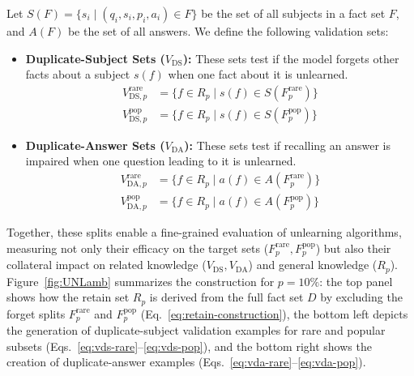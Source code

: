 \documentclass[sigconf,anonymous]{aamas}
\begin{document}
Let $S(F) = \{s_i \mid (q_i, s_i, p_i, a_i) \in F\}$ be the set of all subjects in a fact set $F$, and $A(F)$ be the set of all answers. We define the following validation sets:
\begin{itemize}
    \item \textbf{Duplicate-Subject Sets ($V_{\text{DS}}$):} These sets test if the model forgets other facts about a subject $s(f)$ when one fact about it is unlearned.
    \begin{align}
      V_{\text{DS}, p}^{\text{rare}} &= \{ f \in R_p \mid s(f) \in S(F_p^{\text{rare}}) \} \label{eq:vds-rare} \\
      V_{\text{DS}, p}^{\text{pop}}  &= \{ f \in R_p \mid s(f) \in S(F_p^{\text{pop}}) \} \label{eq:vds-pop}
    \end{align}
    
    \item \textbf{Duplicate-Answer Sets ($V_{\text{DA}}$):} These sets test if recalling an answer is impaired when one question leading to it is unlearned.
    \begin{align}
      V_{\text{DA}, p}^{\text{rare}} &= \{ f \in R_p \mid a(f) \in A(F_p^{\text{rare}}) \} \label{eq:vda-rare} \\
      V_{\text{DA}, p}^{\text{pop}}  &= \{ f \in R_p \mid a(f) \in A(F_p^{\text{pop}}) \} \label{eq:vda-pop}
    \end{align}
\end{itemize}



Together, these splits enable a fine-grained evaluation of unlearning algorithms, measuring not only their efficacy on the target sets ($F_p^{\text{rare}}, F_p^{\text{pop}}$) but also their collateral impact on related knowledge ($V_{\text{DS}}, V_{\text{DA}}$) and general knowledge ($R_p$). Figure~\ref{fig:UNLamb} summarizes the construction for \(p=10\%\): the top panel shows how the retain set \(R_p\) is derived from the full fact set \(D\) by excluding the forget splits \(F_p^{\text{rare}}\) and \(F_p^{\text{pop}}\) (Eq.~\eqref{eq:retain-construction}), the bottom left depicts the generation of duplicate-subject validation examples for rare and popular subsets (Eqs.~\eqref{eq:vds-rare}--\eqref{eq:vds-pop}), and the bottom right shows the creation of duplicate-answer examples (Eqs.~\eqref{eq:vda-rare}--\eqref{eq:vda-pop}).
\end{document}
